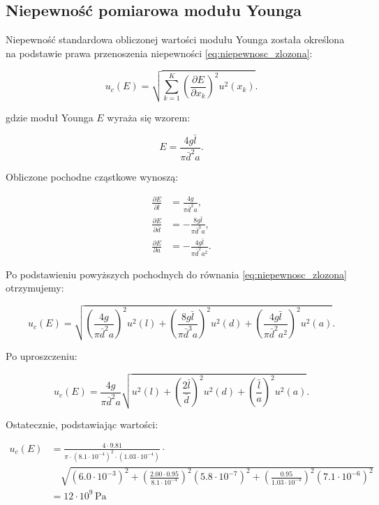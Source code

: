 \documentclass[a4paper,12pt]{article}
\begin{document}
\subsection{Niepewność pomiarowa modułu Younga}

Niepewność standardowa obliczonej wartości modułu Younga została określona na podstawie prawa przenoszenia niepewności \eqref{eq:niepewnosc_zlozona}:

\begin{equation}
\label{eq:niepewnosc_zlozona}
    u_c(E) = \sqrt{\sum_{k=1}^{K} \left( \frac{\partial E}{\partial x_k} \right)^2 u^2(x_k)}.
\end{equation}

gdzie moduł Younga \( E \) wyraża się wzorem:

\begin{equation*}
E = \frac{4g\bar{l}}{\pi\bar{d}^2 a}.
\end{equation*}

Obliczone pochodne cząstkowe wynoszą:

\begin{align*}
    \frac{\partial E}{\partial \bar{l}} &= \frac{4g}{\pi \bar{d}^2 a}, \\
    \frac{\partial E}{\partial \bar{d}} &= -\frac{8g\bar{l}}{\pi \bar{d}^3 a}, \\
    \frac{\partial E}{\partial a} &= -\frac{4g\bar{l}}{\pi \bar{d}^2 a^2}.
\end{align*}

Po podstawieniu powyższych pochodnych do równania \eqref{eq:niepewnosc_zlozona} otrzymujemy:

\begin{equation*}
u_c(E) = \sqrt{\left( \frac{4g}{\pi \bar{d}^2 a} \right)^2 u^2(l) 
+ \left( \frac{8g\bar{l}}{\pi \bar{d}^3 a} \right)^2 u^2(d) 
+ \left( \frac{4g\bar{l}}{\pi \bar{d}^2 a^2} \right)^2 u^2(a)}.
\end{equation*}

Po uproszczeniu:

\begin{equation*}
u_c(E) = \frac{4g}{\pi \bar{d}^2 a} 
\sqrt{ u^2(l) + \left( \frac{2\bar{l}}{\bar{d}} \right)^2 u^2(d) + \left( \frac{\bar{l}}{a} \right)^2 u^2(a) }.
\end{equation*}

Ostatecznie, podstawiając wartości: 

\begin{align*}
u_c(E) &= \frac{4 \cdot 9.81}{\pi \cdot (8.1 \cdot 10^{-4})^2 \cdot (1.03 \cdot 10^{-4})} \cdot 
\\
&\quad \sqrt{ (6.0 \cdot 10^{-3})^2 + \left( \frac{2.00 \cdot 0.95}{8.1 \cdot 10^{-4}} \right)^2 (5.8 \cdot 10^{-7})^2 + \left( \frac{0.95}{1.03 \cdot 10^{-4}} \right)^2 (7.1 \cdot 10^{-6})^2 } 
\\
&= 12 \cdot 10^9\,\text{Pa}
\end{align*}
\end{document}
